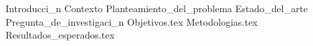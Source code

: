 \documentclass{article}
\begin{document}
  \begin{titlepage}
    \centering
    \vspace*{2cm}
    \titleblock [2cm]
    \vspace{1cm}  %
    \vfill  %
    \location \\
    \dateblock \\
    \footnotesize { \texttt{\fullversion} }
  \end{titlepage}


  \newcommand{\ab}[1]{{\color{red}\textbf{AB\@: #1}}}

  \attributionpage

  \tableofcontents
  \newpage

  \clearpage

  {Introducci_n}
  {Contexto}
  {Planteamiento_del_problema}
  {Estado_del_arte}
  {Pregunta_de_investigaci_n}
  {Objetivos.tex}
  {Metodologias.tex}
  {Resultados_esperados.tex}

  \printbibliography
\end{document}
